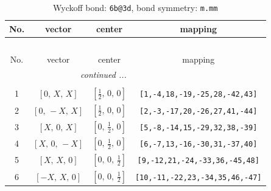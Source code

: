 \documentclass[fleqn,8pt]{jsarticle}
\begin{document}
\renewcommand{\arraystretch}{1.2}
\begin{longtable}{cccc}
\caption{Wyckoff bond: {\tt 6b@3d}, bond symmetry: {\tt m.mm}}
 \\
 \hline \hline
No. & vector & center & mapping \\ \hline \endfirsthead

\multicolumn{3}{l}{\tablename\ \thetable{}} \\
 \hline \hline
No. & vector & center & mapping \\ \hline \endhead

 \hline \hline
\multicolumn{3}{r}{\footnotesize\it continued ...} \\ \endfoot

 \hline \hline
\multicolumn{3}{r}{} \\ \endlastfoot

1 & $\left[ 0,\, X,\, X \right]$ & $\left[ \frac{1}{2},\, 0,\, 0 \right]$ & {\tt [1,-4,18,-19,-25,28,-42,43]} \\ \hline
2 & $\left[ 0,\, - X,\, X \right]$ & $\left[ \frac{1}{2},\, 0,\, 0 \right]$ & {\tt [2,-3,-17,20,-26,27,41,-44]} \\ \hline
3 & $\left[ X,\, 0,\, X \right]$ & $\left[ 0,\, \frac{1}{2},\, 0 \right]$ & {\tt [5,-8,-14,15,-29,32,38,-39]} \\ \hline
4 & $\left[ X,\, 0,\, - X \right]$ & $\left[ 0,\, \frac{1}{2},\, 0 \right]$ & {\tt [6,-7,13,-16,-30,31,-37,40]} \\ \hline
5 & $\left[ X,\, X,\, 0 \right]$ & $\left[ 0,\, 0,\, \frac{1}{2} \right]$ & {\tt [9,-12,21,-24,-33,36,-45,48]} \\ \hline
6 & $\left[ - X,\, X,\, 0 \right]$ & $\left[ 0,\, 0,\, \frac{1}{2} \right]$ & {\tt [10,-11,-22,23,-34,35,46,-47]} \\
\end{longtable}
\renewcommand{\arraystretch}{1.2}
\end{document}
